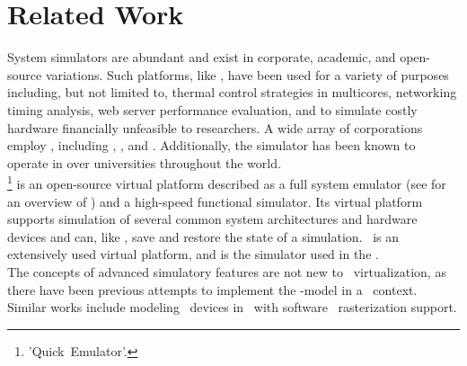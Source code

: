 
\chapter{Related Work}
\label{cha:relatedwork}
System simulators are abundant and exist in corporate, academic, and open-source variations.
Such platforms, like \dvttermsimics , have been used for a variety of purposes including, but not limited to, thermal control strategies in multicores, networking timing analysis, web server performance evaluation, and to simulate costly hardware financially unfeasible to researchers.
A wide array of corporations employ \dvttermsimics , including \dvttermibm {}, \dvttermintel {}, and \dvttermnasa {}.
Additionally, the simulator has been known to operate in over  universities throughout the world.\\

\noindent
\dvttermqemu \footnote{'Quick~Emulator'.} is an open-source virtual platform described as a full system emulator (see  for an overview of \dvttermqemu ) and a high-speed functional simulator.
Its virtual platform supports simulation of several common system architectures and hardware devices and can, like \dvttermsimics , save and restore the state of a simulation.
\dvttermqemu\ is an extensively used virtual platform, and is the simulator used in the \dvttermreferencesolution .\\

\noindent
The concepts of advanced simulatory features are not new to \dvttermgpu\ virtualization, as there have been previous attempts to implement the \dvttermcheckpointrestart -model in a \dvttermgpu\ context.
Similar works include modeling \dvttermgpu\ devices in \dvttermqemu\ with software \dvttermopengles\ rasterization support.


